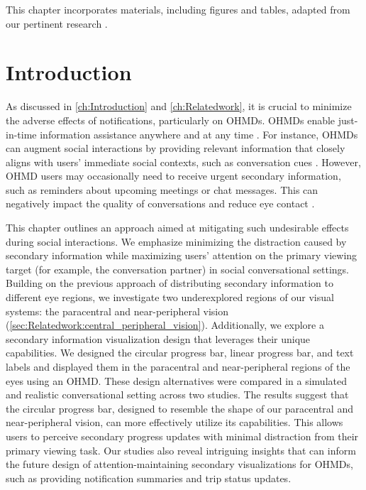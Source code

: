 This chapter incorporates materials, including figures and tables, adapted from our pertinent research \cite{janaka_paracentral_2022}.











\section{Introduction}
\label{sec:Progressbar:introduction}

As discussed in \autoref{ch:Introduction} and \autoref{ch:Relatedwork}, it is crucial to minimize the adverse effects of notifications, particularly on OHMDs. OHMDs enable just-in-time information assistance anywhere and at any time \cite{hobert_application_2016, rhodes_just_time_2000, Klinker2018StructureFI}. For instance, OHMDs can augment social interactions by providing relevant information that closely aligns with users' immediate social contexts, such as conversation cues \cite{williams_designing_2015, nguyen_known_2015, tanveer_rhema_2015}. However, OHMD users may occasionally need to receive urgent secondary information, such as reminders about upcoming meetings or chat messages. This can negatively impact the quality of conversations and reduce eye contact \cite{mcatamney_examination_2006,  koelle_dont_2015}. 

This chapter outlines an approach aimed at mitigating such undesirable effects during social interactions. We emphasize minimizing the distraction caused by secondary information while maximizing users' attention on the primary viewing target (for example, the conversation partner) in social conversational settings. 
Building on the previous approach of distributing secondary information to different eye regions, we investigate two underexplored regions of our visual systems: the paracentral and near-peripheral vision (\autoref{sec:Relatedwork:central_peripheral_vision}). Additionally, we explore a secondary information visualization design that leverages their unique capabilities. We designed the circular progress bar, linear progress bar, and text labels and displayed them in the paracentral and near-peripheral regions of the eyes using an OHMD. These design alternatives were compared in a simulated and realistic conversational setting across two studies. The results suggest that the circular progress bar, designed to resemble the shape of our paracentral and near-peripheral vision, can more effectively utilize its capabilities. This allows users to perceive secondary progress updates with minimal distraction from their primary viewing task. Our studies also reveal intriguing insights that can inform the future design of attention-maintaining secondary visualizations for OHMDs, such as providing notification summaries and trip status updates.


